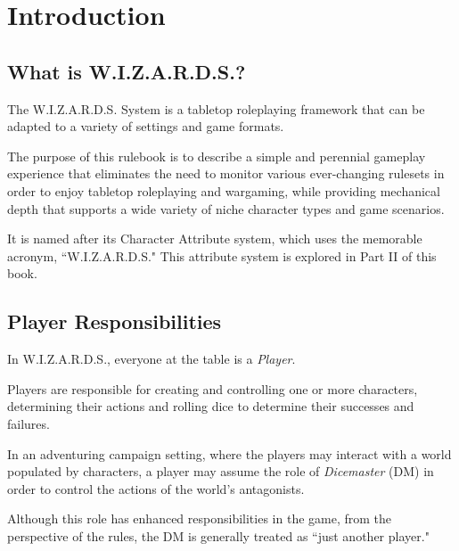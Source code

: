 
\chapter{Introduction}


\section{What is W.I.Z.A.R.D.S.?}
The W.I.Z.A.R.D.S. System is a tabletop roleplaying framework 
that can be adapted to a variety of settings and game formats. 

\vspace{0.4em}

The purpose of this rulebook is to describe a 
simple and perennial gameplay experience that
eliminates the need to monitor various ever-changing rulesets 
in order to enjoy tabletop roleplaying and wargaming,
while providing mechanical depth that supports a wide 
variety of niche character types and game scenarios.

\vspace{0.4em}

It is named after its Character Attribute system, 
which uses the memorable acronym, ``W.I.Z.A.R.D.S."
This attribute system is explored in Part II of this book.



\section{Player Responsibilities}
In W.I.Z.A.R.D.S., everyone at the table is a \textit{Player}. 

\vspace{0.4em}

Players are responsible for creating and controlling one or more characters,
determining their actions and rolling dice to determine their 
successes and failures.

\vspace{0.4em}

In an adventuring campaign setting, 
where the players may interact with a world populated by characters,
a player may assume the role of \textit{Dicemaster} (DM)
in order to control the actions of the world's antagonists.

Although this role has enhanced responsibilities in the game, 
from the perspective of the rules, 
the DM is generally treated as ``just another player."

\vspace{0.4em}

